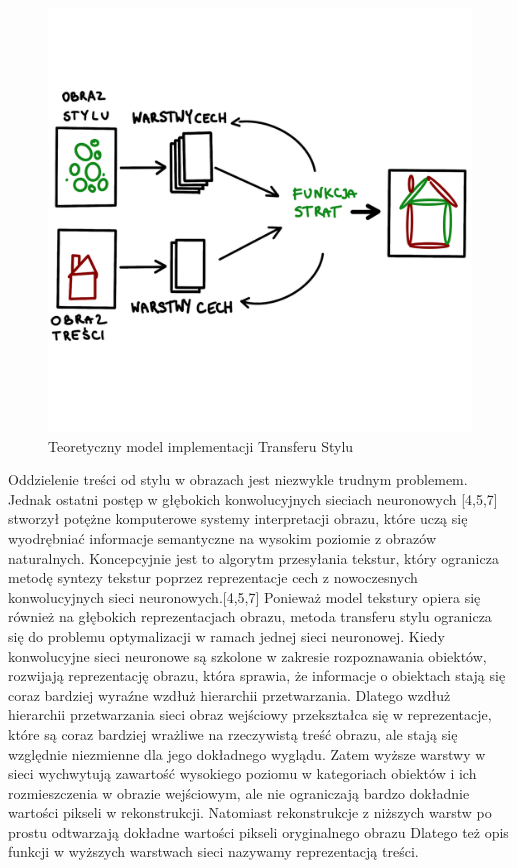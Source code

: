 \documentclass[openright]{xmgr}
\begin{document}
\begin{figure}[!tbh]
\centering
\includegraphics[width=.8\hsize]{fig/12}
\caption{Teoretyczny model implementacji Transferu Stylu\label{RYS.9}}
\end{figure} 

Oddzielenie treści od stylu w obrazach jest niezwykle trudnym problemem. Jednak ostatni postęp w głębokich konwolucyjnych sieciach neuronowych [4,5,7] stworzył potężne komputerowe systemy interpretacji obrazu, które uczą się wyodrębniać informacje semantyczne na wysokim poziomie z obrazów naturalnych. Koncepcyjnie jest to algorytm przesyłania tekstur, który ogranicza metodę syntezy tekstur poprzez reprezentacje cech z nowoczesnych konwolucyjnych sieci neuronowych.[4,5,7] Ponieważ model tekstury opiera się również na głębokich reprezentacjach obrazu, metoda transferu stylu ogranicza się do problemu optymalizacji w ramach jednej sieci neuronowej. Kiedy konwolucyjne sieci neuronowe są szkolone w zakresie rozpoznawania obiektów, rozwijają reprezentację obrazu, która sprawia, że informacje o obiektach stają się coraz bardziej wyraźne wzdłuż hierarchii przetwarzania. Dlatego wzdłuż hierarchii przetwarzania sieci obraz wejściowy przekształca się w reprezentacje, które są coraz bardziej wrażliwe na rzeczywistą treść obrazu, ale stają się względnie niezmienne dla jego dokładnego wyglądu. Zatem wyższe warstwy w sieci wychwytują zawartość wysokiego poziomu w kategoriach obiektów i ich rozmieszczenia w obrazie wejściowym, ale nie ograniczają bardzo dokładnie wartości pikseli w rekonstrukcji. Natomiast rekonstrukcje z niższych warstw po prostu odtwarzają dokładne wartości pikseli oryginalnego obrazu Dlatego też opis funkcji w wyższych warstwach sieci nazywamy reprezentacją treści.
\end{document}
